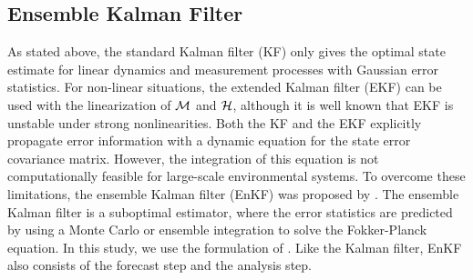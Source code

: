 \subsection{Ensemble Kalman Filter}\label{sec:IntroEnKF}
\par As stated above, the standard Kalman filter (KF) only gives the optimal state estimate for linear dynamics and measurement processes with Gaussian error statistics. For non-linear situations, the extended Kalman filter (EKF) can be used with the linearization of $\mathcal{M}$ and $\mathcal{H}$, although it is well known that EKF is unstable under strong nonlinearities. Both the KF and the EKF explicitly propagate error information with a dynamic equation for the state error covariance matrix. However, the integration of this equation is not computationally feasible for large-scale environmental systems. To overcome these limitations, the ensemble Kalman filter (EnKF) was proposed by \cite{EnKF}. The ensemble Kalman filter is a suboptimal estimator, where the error statistics are predicted by using a Monte Carlo or ensemble integration to solve the Fokker-Planck equation. In this study, we use the formulation of \cite{EnKF2}. Like the Kalman filter, EnKF also consists of the forecast step and the analysis step. \par

